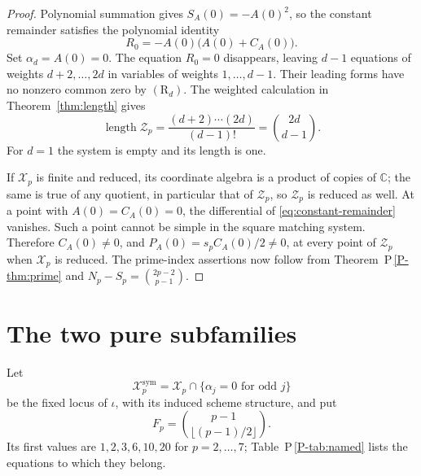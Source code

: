 \documentclass[11pt]{article}
\newcommand{\CC}{\mathbb C}
\newcommand{\len}{\operatorname{length}}
\newcommand{\Xp}{\mathcal X_p}
\numberwithin{equation}{section}
\begin{document}
\begin{proof}
Polynomial summation gives \(S_A(0)=-A(0)^2\), so the
constant remainder satisfies the polynomial identity
\begin{equation}\label{eq:constant-remainder}
 R_0=-A(0)\bigl(A(0)+C_A(0)\bigr).
\end{equation}
Set \(\alpha_d=A(0)=0\).
The equation \(R_0=0\) disappears, leaving \(d-1\) equations
of weights \(d+2,\ldots,2d\) in variables of weights
\(1,\ldots,d-1\).
Their leading forms have no nonzero common zero by
\((\mathrm R_d)\). The weighted calculation in
Theorem~\ref{thm:length} gives
\[
 \len\mathcal Z_p
 =\frac{(d+2)\cdots(2d)}{(d-1)!}
 =\binom{2d}{d-1}.
\]
For \(d=1\) the system is empty and its length is one.

If \(\Xp\) is finite and reduced, its coordinate algebra is a product
of copies of \(\CC\); the same is true of any quotient, in particular
that of \(\mathcal Z_p\), so \(\mathcal Z_p\) is reduced as well.
At a point with \(A(0)=C_A(0)=0\), the differential of
\eqref{eq:constant-remainder} vanishes.
Such a point cannot be simple in the square matching system.
Therefore \(C_A(0)\ne0\), and
\(P_A(0)=s_pC_A(0)/2\ne0\), at every point of \(\mathcal Z_p\)
when \(\Xp\) is reduced.
The prime-index assertions now follow from Theorem~P\,\ref{P-thm:prime}
and \(N_p-S_p=\binom{2p-2}{p-1}\).
\end{proof}


\section{The two pure subfamilies}

Let
\[
 \Xp^{\mathrm{sym}}=\Xp\cap\{\alpha_j=0\text{ for odd }j\}
\]
be the fixed locus of \(\iota\), with its induced scheme structure, and
put
\begin{equation}\label{eq:Fp}
 F_p=\binom{p-1}{\lfloor (p-1)/2\rfloor}.
\end{equation}
Its first values are \(1,2,3,6,10,20\) for \(p=2,\ldots,7\);
Table~P\,\ref{P-tab:named} lists the equations to which they belong.
\end{document}
